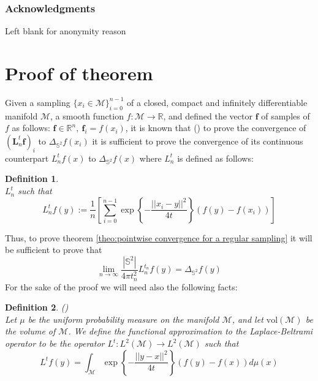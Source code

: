 \documentclass{article} %
\newtheorem{definition}{Definition}[section]
\renewcommand{\b}[1]{{\bm{#1}}}   %
\begin{document}
\subsubsection*{Acknowledgments}
Left blank for anonymity reason





\newpage
{\LARGE {}}
\appendix

\section{Proof of theorem}\label{sec: appendix: proof of theorem}
Given a sampling $\{x_i\in\mathcal M\}_{i=0}^{n-1}$ of a closed, compact and infinitely differentiable manifold $\mathcal M$, a smooth function $f:\mathcal M \rightarrow \mathbb R$, and defined the vector $\b f$ of samples of $f$ as follows: $\b f\in \mathbb R^n,\ \b f_i = f(x_i)$, it is known that  (\cite{belkin2005towards}) to prove the convergence of $(\b {L}_n^t \b f) _i$ to $\Delta_{\mathbb S^2}f(x_i)$ it is sufficient to prove the convergence of its continuous counterpart $L_n^tf(x)$ to $\Delta_{\mathbb S^2}f(x)$
where $L_n^t$ is defined as follows:
\begin{definition}{}\\
	\label{def:Heat Kernel Graph Laplacian operator}
	$L_n^t$ such that
	$$L_n^tf(y) := \frac{1}{n}\left[ \sum_{i=0}^{n-1} \exp \left\{ {-\frac{||x_i-y||^2}{4t}}\right\}\left(f(y)-f(x_i)\right)\right]$$
\end{definition}
Thus, to prove theorem \ref{theo:pointwise convergence for a regular sampling} it will be sufficient to prove that 
\begin{equation}\label{eq:continuous convergence}
 \lim_{n\to\infty} \frac{|\mathbb{S}^2|}{4\pi t_n^2} {L}_n^{t_n} f(y) =  \Delta_{\mathbb{S}^2}f(y)
\end{equation}
For the sake of the proof we will need also the following facts:
\begin{definition}{} (\cite{belkin2005towards})\\ \label{eq: my L^t} Let $\mu$ be the uniform probability measure on the manifold $\mathcal M$, and let $\text{vol}(\mathcal M)$ be the volume of $\mathcal M$. We define the functional approximation to the Laplace-Beltrami operator to be the operator $L^t: L^{2}(\mathcal{M}) \rightarrow L^{2}(\mathcal{M})$ such that
	\label{def:Functional approximation to the Laplace-Beltrami operator}
	$$ L^tf(y) = \int_{\mathcal M}\exp\left\{-\frac{||y-x||^2}{4t}\right\}\left(f(y)-f(x)\right)d\mu(x)$$
\end{definition}
\end{document}
